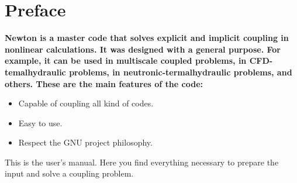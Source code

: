 \chapter*{Preface}

\par
\bf{Newton} is a master code that solves explicit and implicit coupling in nonlinear calculations. It was designed with a general purpose. 
For example, it can be used in multiscale coupled problems, in CFD-temalhydraulic problems, in neutronic-termalhydraulic problems, and others.
These are the main features of the code:
\begin{itemize} 
 \item Capable of coupling all kind of codes.
 \item Easy to use.
 \item Respect the GNU project philosophy.
\end{itemize}
This is the user's manual. Here you find everything necessary to prepare the input and solve a coupling problem.



